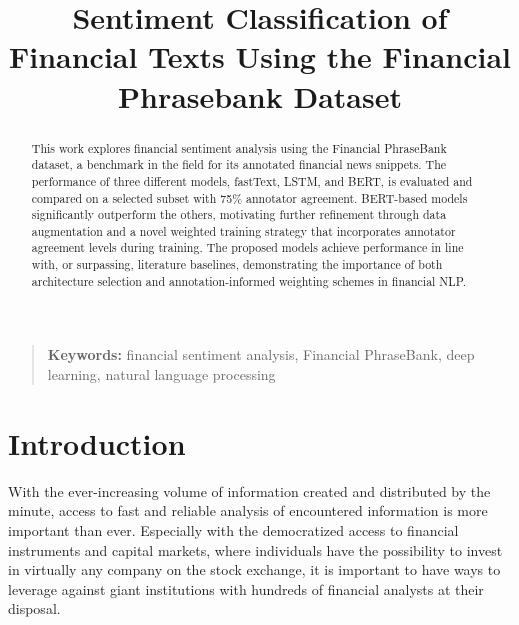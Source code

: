 \documentclass[conference]{IEEEtran}
\begin{document}
\title{Sentiment Classification of Financial Texts Using the Financial Phrasebank Dataset}

\author{
\and
{}
}

\maketitle
\thispagestyle{plain}

\begin{abstract}
This work explores financial sentiment analysis using the Financial PhraseBank dataset, a benchmark in the field for its annotated financial news snippets. The performance of three different models, fastText, LSTM, and BERT, is evaluated and compared on a selected subset with 75\% annotator agreement. BERT-based models significantly outperform the others, motivating further refinement through data augmentation and a novel weighted training strategy that incorporates annotator agreement levels during training. The proposed models achieve performance in line with, or surpassing, literature baselines, demonstrating the importance of both architecture selection and annotation-informed weighting schemes in financial NLP.
\end{abstract}

\begin{quote}
\small
\noindent
\textbf{Keywords:}  financial sentiment analysis, Financial PhraseBank, deep learning, natural language processing
\end{quote}

\IEEEpeerreviewmaketitle


\section{Introduction}

With the ever-increasing volume of information created and distributed by the minute, access to fast and reliable analysis of encountered information is more important than ever. Especially with the democratized access to financial instruments and capital markets, where individuals have the possibility to invest in virtually any company on the stock exchange, it is important to have ways to leverage against giant institutions with hundreds of financial analysts at their disposal. 
\end{document}
